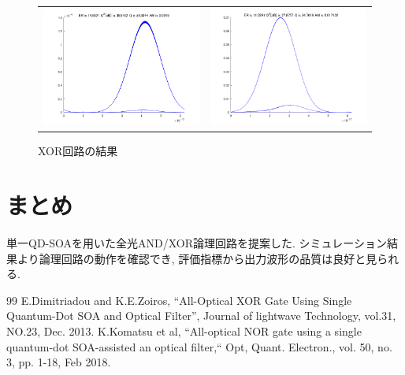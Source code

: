 \documentclass[dvipdfmx]{ujarticle}
\begin{document}
\begin{figure}[H]
  \begin{tabular}{cc}
    \begin{minipage}[t]{0.45\hsize}
      \centering
      \includegraphics[width=7cm]{images/and_result.png}
      \caption{AND回路の結果}
    \end{minipage} &
    \begin{minipage}[t]{0.45\hsize}
      \centering
      \includegraphics[width=7cm]{images/xor_result.png}
      \caption{XOR回路の結果}
    \end{minipage}
  \end{tabular}
\end{figure}

\section{まとめ}
単一QD-SOAを用いた全光AND/XOR論理回路を提案した.
シミュレーション結果より論理回路の動作を確認でき, 評価指標から出力波形の品質は良好と見られる.

\begin{thebibliography} {99}
   E.Dimitriadou and K.E.Zoiros, “All-Optical XOR Gate Using Single Quantum-Dot SOA and Optical Filter”, Journal of lightwave Technology, vol.31, NO.23, Dec. 2013.
   K.Komatsu et al, “All-optical NOR gate using a single quantum-dot SOA-assisted an optical filter,“ Opt, Quant. Electron., vol. 50, no. 3, pp. 1-18, Feb 2018.
\end{thebibliography}
\end{document}
